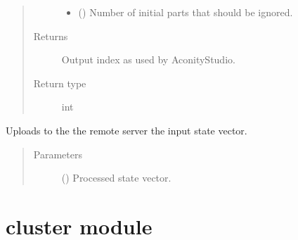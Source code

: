 \documentclass[letterpaper,10pt,english,openany,oneside]{sphinxmanual}
\begin{document}
\begin{fulllineitems}
\begin{fulllineitems}
\begin{quote}
\begin{description}
\begin{itemize}
\item {} 
 () \textendash{} Number of initial parts that should be ignored.

\end{itemize}

\item[{Returns}] \leavevmode
Output index as used by AconityStudio.

\item[{Return type}] \leavevmode
int

\end{description}\end{quote}

\end{fulllineitems}


\begin{fulllineitems}
\label{\detokenize{_modules/machine:machine.Machine.sendStates}}
Uploads to the the remote server the input state vector.
\begin{quote}\begin{description}
\item[{Parameters}] \leavevmode
{} () \textendash{} Processed state vector.

\end{description}\end{quote}

\end{fulllineitems}


\end{fulllineitems}



\section{cluster module}
\label{\detokenize{_modules/cluster:module-cluster}}\label{\detokenize{_modules/cluster:cluster-module}}\label{\detokenize{_modules/cluster::doc}}
\end{document}
